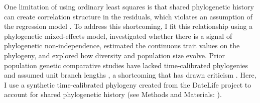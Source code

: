 \documentclass[9pt,lineno]{elife}
\begin{document}
One limitation of using ordinary least squares is that shared phylogenetic
history can create correlation structure in the residuals, which violates an
assumption of the regression model
\citep{Felsenstein1985-an,Revell2010-mf}. To address this shortcoming, I
fit this relationship using a phylogenetic mixed-effects model, investigated
whether there is a signal of phylogenetic non-independence, estimated the
continuous trait values on the phylogeny, and explored how diversity and
population size evolve. Prior population genetic comparative studies have
lacked time-calibrated phylogenies and assumed unit branch lengths
\citep{Whitney2010-ud}, a shortcoming that has drawn criticism
\citep{Lynch2011-qv}. Here, I use a synthetic time-calibrated phylogeny
created from the DateLife project \citep{OMeara2020-ds} to account for
shared phylogenetic history (see Methods and Materials: ).
\end{document}
